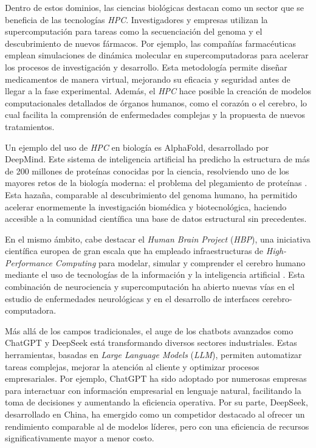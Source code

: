 Dentro de estos dominios, las ciencias biológicas destacan como un sector que se beneficia de las tecnologías \textit{HPC}. Investigadores y empresas utilizan la supercomputación para tareas como la secuenciación del genoma y el descubrimiento de nuevos fármacos. Por ejemplo, las compañías farmacéuticas emplean simulaciones de dinámica molecular en supercomputadoras para acelerar los procesos de investigación y desarrollo. Esta metodología permite diseñar medicamentos de manera virtual, mejorando su eficacia y seguridad antes de llegar a la fase experimental. Además, el \textit{HPC} hace posible la creación de modelos computacionales detallados de órganos humanos, como el corazón o el cerebro, lo cual facilita la comprensión de enfermedades complejas y la propuesta de nuevos tratamientos.

Un ejemplo del uso de \textit{HPC} en biología es AlphaFold, desarrollado por DeepMind. Este sistema de inteligencia artificial ha predicho la estructura de más de 200 millones de proteínas conocidas por la ciencia, resolviendo uno de los mayores retos de la biología moderna: el problema del plegamiento de proteínas \cite{ref3}. Esta hazaña, comparable al descubrimiento del genoma humano, ha permitido acelerar enormemente la investigación biomédica y biotecnológica, haciendo accesible a la comunidad científica una base de datos estructural sin precedentes.

En el mismo ámbito, cabe destacar el \textit{Human Brain Project} (\textit{HBP}), una iniciativa científica europea de gran escala que ha empleado infraestructuras de \textit{High-Performance Computing} para modelar, simular y comprender el cerebro humano mediante el uso de tecnologías de la información y la inteligencia artificial \cite{ref4}. Esta combinación de neurociencia y supercomputación ha abierto nuevas vías en el estudio de enfermedades neurológicas y en el desarrollo de interfaces cerebro-computadora.

Más allá de los campos tradicionales, el auge de los chatbots avanzados como ChatGPT y DeepSeek está transformando diversos sectores industriales. Estas herramientas, basadas en \textit{Large Language Models} (\textit{LLM}), permiten automatizar tareas complejas, mejorar la atención al cliente y optimizar procesos empresariales. Por ejemplo, ChatGPT ha sido adoptado por numerosas empresas para interactuar con información empresarial en lenguaje natural, facilitando la toma de decisiones y aumentando la eficiencia operativa. Por su parte, DeepSeek, desarrollado en China, ha emergido como un competidor destacado al ofrecer un rendimiento comparable al de modelos líderes, pero con una eficiencia de recursos significativamente mayor a menor costo.

